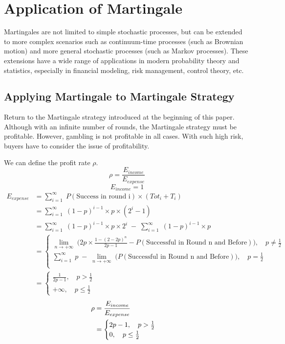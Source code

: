 \documentclass[11pt]{article} %
\begin{document}
\section{Application of Martingale}

Martingales are not limited to simple stochastic processes, but can be extended to more complex scenarios such as continuum-time processes (such as Brownian motion) and more general stochastic processes (such as Markov processes). These extensions have a wide range of applications in modern probability theory and statistics, especially in financial modeling, risk management, control theory, etc.
\subsection{Applying Martingale to Martingale Strategy}

Return to the Martingale strategy introduced at the beginning of this paper. Although with an infinite number of rounds, the Martingale strategy must be profitable. However, gambling is not profitable in all cases. With such high risk, buyers have to consider the issue of profitability.

We can define the profit rate $\rho$.
$$
	\rho = \frac{E_{income}}{E_{expense}}
$$
$$
E_{income} = 1
$$
$$
\begin{aligned}
E_{expense} &= \sum_{i=1}^{\infty}\; P(\text{Success in round i})\times (Tot_i + T_i) \\
&= \sum_{i=1}^{\infty}\; (1-p)^{i-1}\times p\times (2^{i} -1)\\
&= \sum_{i=1}^{\infty}\; (1-p)^{i-1}\times p\times 2^{i} \; - \; \sum_{i=1}^{\infty}\; (1-p)^{i-1}\times p \\
&=
\begin{cases}
\lim_{n \rightarrow +\infty}\;\bigg(2p\times \frac{1-(2-2p)^n}{2p-1} -P(\text{Successful in Round n and Before})\bigg),\quad p \neq \frac{1}{2}\\
\sum_{i=1}^{\infty}\; p \; - \; \lim_{n \rightarrow +\infty}\;\bigg(P(\text{Successful in Round n and Before})\bigg),\quad p = \frac{1}{2}\\
\end{cases} \\
&=\begin{cases}
\frac{1}{2p-1} , \quad p> \frac{1}{2} \\
+\infty, \quad p \leq \frac{1}{2}
\end{cases}
\end{aligned}
$$
$$
\begin{aligned}
\rho &=\frac{E_{income}}{E_{expense}} \\
&=\begin{cases}
2p-1, \quad p> \frac{1}{2} \\
0, \quad p \leq \frac{1}{2}
\end{cases}
\end{aligned} \\
$$
\end{document}
